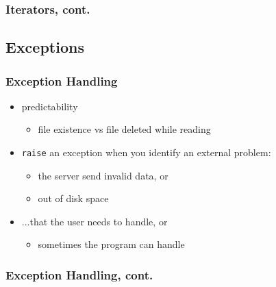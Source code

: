 \begin{frame}[fragile]\frametitle{Iterators, cont.}



\end{frame}




\subsection{Exceptions}
\begin{frame}\frametitle{Exception Handling}

\begin{itemize}

\item predictability
\begin{itemize}
\item file existence vs file deleted while reading
\end{itemize}

\item \texttt{raise} an exception when you identify an external problem:
\begin{itemize}
\item the server send invalid data, or
\item out of disk space
\end{itemize}

\item ...that the user needs to handle, or
\begin{itemize}
\item sometimes the program can handle
\end{itemize}

\end{itemize}

\end{frame}



\begin{frame}[fragile]\frametitle{Exception Handling, cont.}

\end{frame}

